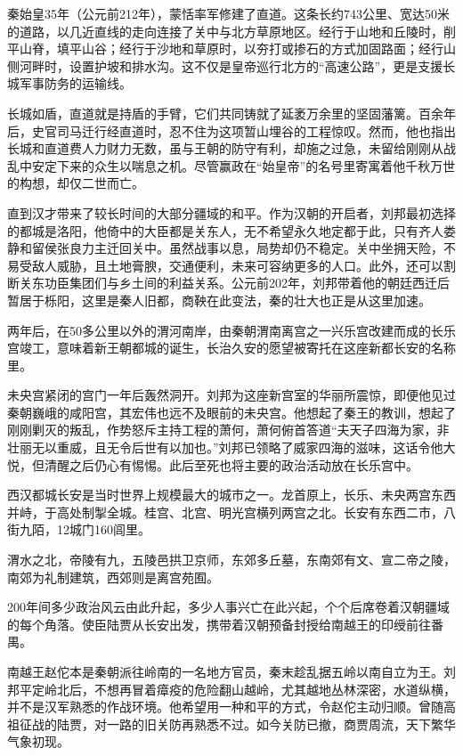 秦始皇35年（公元前212年），蒙恬率军修建了直道。这条长约743公里、宽达50米的道路，以几近直线的走向连接了关中与北方草原地区。经行于山地和丘陵时，削平山脊，填平山谷；经行于沙地和草原时，以夯打或掺石的方式加固路面；经行山侧河畔时，设置护坡和排水沟。这不仅是皇帝巡行北方的“高速公路”，更是支援长城军事防务的运输线。

长城如盾，直道就是持盾的手臂，它们共同铸就了延袤万余里的坚固藩篱。百余年后，史官司马迁行经直道时，忍不住为这项暂山埋谷的工程惊叹。然而，他也指出长城和直道费人力财力无数，虽与王朝的防守有利，却施之过急，未留给刚刚从战乱中安定下来的众生以喘息之机。尽管赢政在“始皇帝”的名号里寄寓着他千秋万世的构想，却仅二世而亡。

直到汉才带来了较长时间的大部分疆域的和平。作为汉朝的开启者，刘邦最初选择的都城是洛阳，他倚中的大臣都是关东人，无不希望永久地定都于此，只有齐人娄静和留侯张良力主迁回关中。虽然战事以息，局势却仍不稳定。关中坐拥天险，不易受敌人威胁，且土地膏腴，交通便利，未来可容纳更多的人口。此外，还可以割断关东功臣集团们与乡土间的利益关系。公元前202年，刘邦带着他的朝廷西迁后暂居于栎阳，这里是秦人旧都，商鞅在此变法，秦的壮大也正是从这里加速。

两年后，在50多公里以外的渭河南岸，由秦朝渭南离宫之一兴乐宫改建而成的长乐宫竣工，意味着新王朝都城的诞生，长治久安的愿望被寄托在这座新都长安的名称里。

未央宫紧闭的宫门一年后轰然洞开。刘邦为这座新宫室的华丽所震惊，即便他见过秦朝巍峨的咸阳宫，其宏伟也远不及眼前的未央宫。他想起了秦王的教训，想起了刚刚剿灭的叛乱，作势怒斥主持工程的萧何，萧何俯首答道“夫天子四海为家，非壮丽无以重威，且无令后世有以加也。”刘邦已领略了威家四海的滋味，这话令他大悦，但清醒之后仍心有惕惕。此后至死也将主要的政治活动放在长乐宫中。

西汉都城长安是当时世界上规模最大的城市之一。龙首原上，长乐、未央两宫东西并峙，于高处制掣全城。桂宫、北宫、明光宫横列两宫之北。长安有东西二市，八街九陌，12城门160闾里。

渭水之北，帝陵有九，五陵邑拱卫京师，东郊多丘墓，东南郊有文、宣二帝之陵，南郊为礼制建筑，西郊则是离宫苑囿。

200年间多少政治风云由此升起，多少人事兴亡在此兴起，个个后席卷着汉朝疆域的每个角落。使臣陆贾从长安出发，携带着汉朝预备封授给南越王的印绶前往番禺。

南越王赵佗本是秦朝派往岭南的一名地方官员，秦末趁乱据五岭以南自立为王。刘邦平定岭北后，不想再冒着瘴疫的危险翻山越岭，尤其越地丛林深密，水道纵横，并不是汉军熟悉的作战环境。他希望用一种和平的方式，令赵佗主动归顺。曾随高祖征战的陆贾，对一路的旧关防再熟悉不过。如今关防已撤，商贾周流，天下繁华气象初现。

